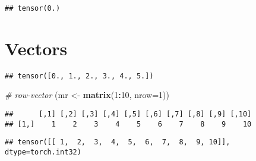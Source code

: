 \documentclass[]{book}
\newenvironment{Shaded}{\begin{snugshade}}{\end{snugshade}}
\newcommand{\CommentTok}[1]{\textcolor[rgb]{0.56,0.35,0.01}{\textit{#1}}}
\newcommand{\DataTypeTok}[1]{\textcolor[rgb]{0.13,0.29,0.53}{#1}}
\newcommand{\DecValTok}[1]{\textcolor[rgb]{0.00,0.00,0.81}{#1}}
\newcommand{\KeywordTok}[1]{\textcolor[rgb]{0.13,0.29,0.53}{\textbf{#1}}}
\newcommand{\NormalTok}[1]{#1}
\newcommand{\OperatorTok}[1]{\textcolor[rgb]{0.81,0.36,0.00}{\textbf{#1}}}
\newcommand{\StringTok}[1]{\textcolor[rgb]{0.31,0.60,0.02}{#1}}
\begin{document}
\begin{verbatim}
## tensor(0.)
\end{verbatim}

\hypertarget{vectors}{%
\section{Vectors}\label{vectors}}

\begin{Shaded}
\end{Shaded}

\begin{verbatim}
## tensor([0., 1., 2., 3., 4., 5.])
\end{verbatim}

\begin{Shaded}
\begin{Highlighting}[]
\CommentTok{# row-vector}
\NormalTok{(mr <-}\StringTok{ }\KeywordTok{matrix}\NormalTok{(}\DecValTok{1}\OperatorTok{:}\DecValTok{10}\NormalTok{, }\DataTypeTok{nrow=}\DecValTok{1}\NormalTok{))}
\end{Highlighting}
\end{Shaded}

\begin{verbatim}
##      [,1] [,2] [,3] [,4] [,5] [,6] [,7] [,8] [,9] [,10]
## [1,]    1    2    3    4    5    6    7    8    9    10
\end{verbatim}

\begin{Shaded}
\end{Shaded}

\begin{verbatim}
## tensor([[ 1,  2,  3,  4,  5,  6,  7,  8,  9, 10]], dtype=torch.int32)
\end{verbatim}

\begin{Shaded}
\end{Shaded}
\end{document}
